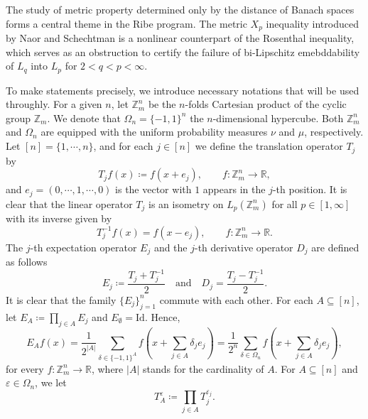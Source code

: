 \documentclass{amsart}
\numberwithin{equation}{section}
\newcommand{\Z}{{\mathbb{Z}^{n}_{m}}}
\begin{document}
The study of metric property determined only by the distance of Banach spaces forms a central theme in the Ribe program. The metric $X_{p}$ inequality introduced by Naor and Schechtman \cite{N-S2016} is a nonlinear counterpart of the Rosenthal inequality, which serves as an obstruction to certify the failure of bi-Lipschitz emebddability of $L_{q}$ into $L_{p}$ for $2<q<p<\infty$.

To make statements precisely, we introduce necessary notations that will be used throughly. For a given $n$, let $\Z$ be the $n$-folds Cartesian product of the cyclic group $\mathbb{Z}_{m}$. We denote that $\Omega_{n}=\{-1,1\}^{n}$ the $n$-dimensional hypercube. Both $\Z$ and $\Omega_{n}$ are equipped with the uniform probability measures $\nu$ and $\mu$, respectively. Let $[n]=\{1,\cdots, n\}$, and for each $j\in [n]$ we define the translation operator $T_{j}$ by
\[
T_{j}f(x)\coloneqq f(x+e_{j}),\qquad f:\Z\to \mathbb{R},
\]
and $e_{j}=(0,\cdots, 1,\cdots,0)$ is the vector with $1$ appears in the $j$-th position. It is clear that the linear operator $T_{j}$ is an isometry on $L_{p}(\Z)$ for all $p\in [1,\infty]$ with its inverse given by
\[
T^{-1}_{j}f(x)=f(x-e_{j}),\qquad f:\Z\to \mathbb{R}.
\]
The $j$-th expectation operator $E_{j}$ and the $j$-th derivative operator $D_{j}$ are defined as follows
\[
E_{j}\coloneqq \frac{T_{j}+T^{-1}_{j}}{2}\quad\mbox{and}\quad D_{j}=\frac{T_{j}-T^{-1}_{j}}{2}.
\]
It is clear that the family $\{E_{j}\}_{j=1}^{n}$ commute with each other. For each $A\subseteq [n]$, let $E_{A}\coloneqq \prod_{j\in A}E_{j}$ and $E_{\emptyset}=\mathrm{Id}$. Hence,
\[
E_{A}f(x)=\frac{1}{2^{|A|}}\sum_{\delta\in \{-1,1\}^{A}}f\left(x+\sum_{j\in A}\delta_{j}e_{j}\right)=\frac{1}{2^{n}}\sum_{\delta\in \Omega_{n}}f\left(x+\sum_{j\in A}\delta_{j}e_{j}\right),
\]
for every $f:\Z\to \mathbb{R}$, where $|A|$ stands for the cardinality of $A$. For $A\subseteq [n]$ and $\varepsilon\in \Omega_{n}$, we let
\[
T^{\varepsilon}_{A}\coloneqq \prod_{j\in A}T^{\varepsilon_{j}}_{j}.
\]
\end{document}
